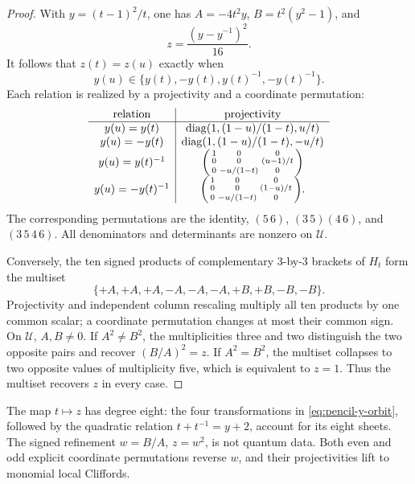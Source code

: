 \begin{proof}
With \(y=(t-1)^2/t\), one has \(A=-4t^2y\), \(B=t^2(y^2-1)\), and
\[
 z=\frac{(y-y^{-1})^2}{16}.
\]
It follows that \(z(t)=z(u)\) exactly when
\begin{equation}\label{eq:pencil-y-orbit}
 y(u)\in\{y(t),-y(t),y(t)^{-1},-y(t)^{-1}\}.
\end{equation}
Each relation is realized by a projectivity and a coordinate permutation:
\[
\begin{array}{c|c}
\text{relation}&\text{projectivity}\\ \hline
y(u)=y(t)&\operatorname{diag}(1,(1-u)/(1-t),u/t)\\
y(u)=-y(t)&\operatorname{diag}(1,(1-u)/(1-t),-u/t)\\
y(u)=y(t)^{-1}&
\begin{psmallmatrix}1&0&0\\0&0&(u-1)/t\\0&-u/(1-t)&0\end{psmallmatrix}\\
y(u)=-y(t)^{-1}&
\begin{psmallmatrix}1&0&0\\0&0&(1-u)/t\\0&-u/(1-t)&0\end{psmallmatrix}.
\end{array}
\]
The corresponding permutations are the identity, \((5\,6)\),
\((3\,5)(4\,6)\), and \((3\,5\,4\,6)\).  All denominators and
determinants are nonzero on \(\mathcal U\).

Conversely, the ten signed products of complementary \(3\)-by-\(3\) brackets
of \(H_t\) form the multiset
\begin{equation}\label{eq:complementary-bracket-multiset}
\{+A,+A,+A,-A,-A,-A,+B,+B,-B,-B\}.
\end{equation}
Projectivity and independent column rescaling multiply all ten products by
one common scalar; a coordinate permutation changes at most their common
sign.  On \(\mathcal U\), \(A,B\ne0\).  If \(A^2\ne B^2\), the
multiplicities three and two distinguish the two opposite pairs and recover
\((B/A)^2=z\).  If \(A^2=B^2\), the multiset collapses to two opposite
values of multiplicity five, which is equivalent to \(z=1\).  Thus the
multiset recovers \(z\) in every case.
\end{proof}

The map \(t\mapsto z\) has degree eight: the four transformations in
\eqref{eq:pencil-y-orbit}, followed by the quadratic relation
\(t+t^{-1}=y+2\), account for its eight sheets.  The signed refinement
\(w=B/A\), \(z=w^2\), is not quantum data.  Both even and odd explicit
coordinate permutations reverse \(w\), and their projectivities lift to
monomial local Cliffords.

